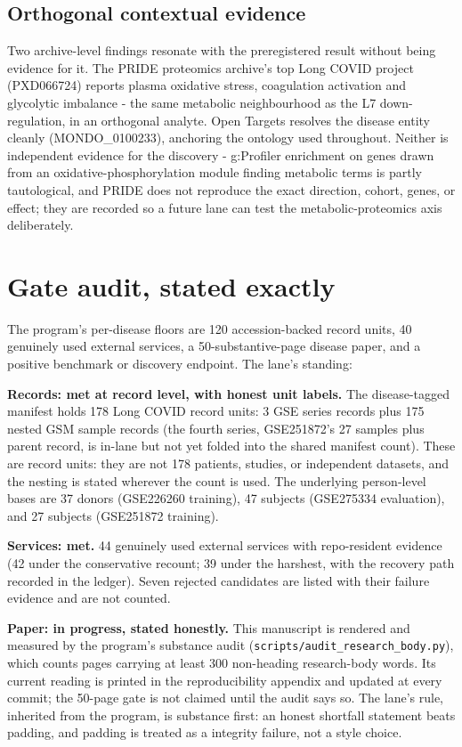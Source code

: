 \documentclass[11pt,a4paper]{article}
\begin{document}
\subsection{Orthogonal contextual evidence}
Two archive-level findings resonate with the preregistered result without
being evidence for it. The PRIDE proteomics archive's top Long COVID project
(PXD066724) reports plasma oxidative stress, coagulation activation and
glycolytic imbalance - the same metabolic neighbourhood as the L7
down-regulation, in an orthogonal analyte. Open Targets resolves the disease
entity cleanly (MONDO\_0100233), anchoring the ontology used throughout.
Neither is independent evidence for the discovery - g:Profiler enrichment
on genes drawn from an oxidative-phosphorylation module finding metabolic
terms is partly tautological, and PRIDE does not reproduce the exact
direction, cohort, genes, or effect; they are recorded so a future lane can
test the metabolic-proteomics axis deliberately.


\section{Gate audit, stated exactly}
The program's per-disease floors are 120 accession-backed record units, 40
genuinely used external services, a 50-substantive-page disease paper, and a
positive benchmark or discovery endpoint. The lane's standing:

\textbf{Records: met at record level, with honest unit labels.} The
disease-tagged manifest holds 178 Long COVID record units: 3 GSE series
records plus 175 nested GSM sample records (the fourth series, GSE251872's 27
samples plus parent record, is in-lane but not yet folded into the shared
manifest count). These are record units: they are not 178 patients, studies,
or independent datasets, and the nesting is stated wherever the count is used.
The underlying person-level bases are 37 donors (GSE226260 training), 47
subjects (GSE275334 evaluation), and 27 subjects (GSE251872 training).

\textbf{Services: met.} 44 genuinely used external services with repo-resident
evidence (42 under the conservative recount; 39 under the harshest, with the
recovery path recorded in the ledger). Seven rejected candidates are listed
with their failure evidence and are not counted.

\textbf{Paper: in progress, stated honestly.} This manuscript is rendered and
measured by the program's substance audit (\texttt{scripts/audit\_research\_body.py}),
which counts pages carrying at least 300 non-heading research-body words. Its
current reading is printed in the reproducibility appendix and updated at
every commit; the 50-page gate is not claimed until the audit says so. The
lane's rule, inherited from the program, is substance first: an honest
shortfall statement beats padding, and padding is treated as a integrity
failure, not a style choice.
\end{document}
